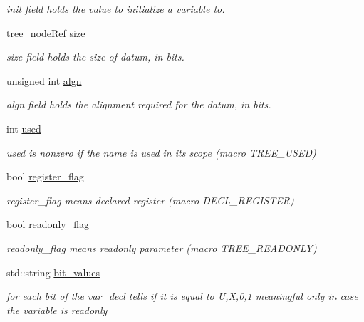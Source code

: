 \begin{DoxyCompactItemize}
\begin{DoxyCompactList}\small\item\em init field holds the value to initialize a variable to. \end{DoxyCompactList}\item 
\hyperlink{tree__node_8hpp_a6ee377554d1c4871ad66a337eaa67fd5}{tree\+\_\+node\+Ref} \hyperlink{structvar__decl_a9410677ae223d8604f3ac95bc235b84f}{size}
\begin{DoxyCompactList}\small\item\em size field holds the size of datum, in bits. \end{DoxyCompactList}\item 
unsigned int \hyperlink{structvar__decl_a3b7aaf57d46b483a5a24dce869610137}{algn}
\begin{DoxyCompactList}\small\item\em algn field holds the alignment required for the datum, in bits. \end{DoxyCompactList}\item 
int \hyperlink{structvar__decl_ac9259d77c70867cde093fad6bc07b48c}{used}
\begin{DoxyCompactList}\small\item\em used is nonzero if the name is used in its scope (macro T\+R\+E\+E\+\_\+\+U\+S\+ED) \end{DoxyCompactList}\item 
bool \hyperlink{structvar__decl_abde3560ae9954ac4c62449fd10dfe6a5}{register\+\_\+flag}
\begin{DoxyCompactList}\small\item\em register\+\_\+flag means declared \textquotesingle{}register\textquotesingle{} (macro D\+E\+C\+L\+\_\+\+R\+E\+G\+I\+S\+T\+ER) \end{DoxyCompactList}\item 
bool \hyperlink{structvar__decl_aafdd8d92e8291c153d7af1618c421da0}{readonly\+\_\+flag}
\begin{DoxyCompactList}\small\item\em readonly\+\_\+flag means readonly parameter (macro T\+R\+E\+E\+\_\+\+R\+E\+A\+D\+O\+N\+LY) \end{DoxyCompactList}\item 
std\+::string \hyperlink{structvar__decl_a1b7ca559efdbf5bb4a7bbbc36be84dbb}{bit\+\_\+values}
\begin{DoxyCompactList}\small\item\em for each bit of the \hyperlink{structvar__decl}{var\+\_\+decl} tells if it is equal to U,X,0,1 meaningful only in case the variable is readonly \end{DoxyCompactList}\item 

\end{DoxyCompactItemize}
